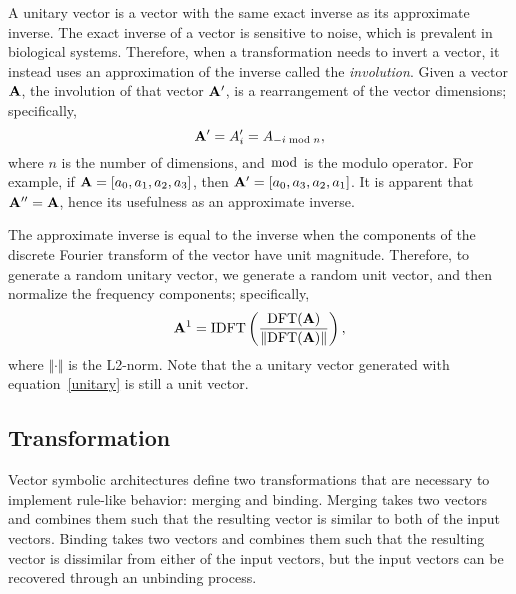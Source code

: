 {{A unitary vector is a vector with
the same exact inverse
as its approximate inverse.
The exact inverse of a vector
is sensitive to noise,
which is prevalent in biological systems.
Therefore, when a transformation needs to
invert a vector,
it instead uses an approximation
of the inverse called the \textit{involution}.
Given a vector $\mathbf{A}$, the involution
of that vector $\mathbf{A'}$,
is a rearrangement of the vector dimensions;
specifically,
\begin{equation}
  \mathbf{A'} = A'_{i} = A_{-i \bmod n},
\end{equation}
where $n$ is the number of dimensions,
and $\bmod$ is the modulo operator.
For example, if $\mathbf{A} = [a_0, a_1, a_2, a_3]$,
then $\mathbf{A'} = [a_0, a_3, a_2, a_1]$.
It is apparent that $\mathbf{A''} = \mathbf{A}$,
hence its usefulness as an approximate inverse.

The approximate inverse is equal to the
inverse when the components
of the discrete Fourier transform
of the vector have unit magnitude.
Therefore, to generate a random unitary vector,
we generate a random unit vector,
and then normalize
the frequency components;
specifically,
\begin{equation} \label{unitary}
  \mathbf{A}^1 = \text{IDFT}\left(
    \frac{\text{DFT}(\mathbf{A})}{\Vert\text{DFT}(\mathbf{A})\Vert}\right),
\end{equation}
where $\Vert\cdot\Vert$ is the L2-norm.
Note that the a unitary vector generated
with equation~\eqref{unitary}
is still a unit vector.

\subsection{Transformation}
\label{sec:spa-transformation}

Vector symbolic architectures
define two transformations
that are necessary
to implement rule-like behavior:
merging and binding.
Merging takes two vectors
and combines them such that
the resulting vector
is similar to both of the input vectors.
Binding takes two vectors
and combines them such that
the resulting vector
is dissimilar from either of the input vectors,
but the input vectors can be recovered
through an unbinding process.

}}
